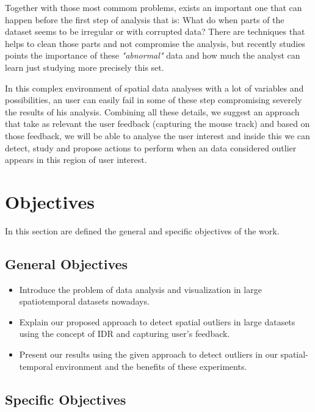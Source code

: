 Together with those most commom problems, exists an important one that can happen before
the first step of analysis that is: What do when parts of the dataset seems to be irregular
or with corrupted data? There are techniques that helps to clean those parts and not compromise
the analysis,
but recently studies points the importance of these \textit{"abnormal"} data and how much
the analyst can learn just studying more precisely this set. \cite{DBLP:journals/debu/FreireCVZ16}

In this complex environment of spatial data analyses with a lot of variables and possibilities,
an user can easily fail in some of these step compromising severely the results of his analysis.
Combining all these details, we suggest an approach that take as relevant the user feedback
(capturing the mouse track) and based on those feedback, we will be able to analyse the user
interest and inside this we can detect, study and propose actions to perform when an data considered
outlier appears in this region of user interest.

\section{Objectives}

In this section are defined the general and specific objectives of the work.

\subsection{General Objectives}

\begin{itemize}
	\item
	      Introduce the problem of data analysis and visualization in large spatiotemporal
	      datasets nowadays.
	\item
	      Explain our proposed approach to detect spatial outliers in large datasets using
	      the concept of IDR and capturing user's feedback.
	\item
	      Present our results using the given approach to detect outliers in our spatial-temporal
	      environment and the benefits of these experiments.

\end{itemize}

\subsection{Specific Objectives}

